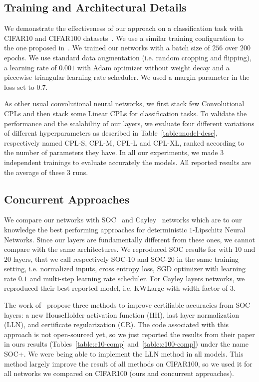 \subsection{Training and Architectural Details}
\label{sec:setting-xp}

We demonstrate the effectiveness of our approach on a classification task with CIFAR10 and CIFAR100 datasets~\citep{krizhevsky2009learning}. We use a similar training configuration to the one proposed in~\citep{trockman2021orthogonalizing}.
We trained our networks with a batch size of $256$ over $200$ epochs.
We use standard data augmentation (i.e. random cropping and flipping), a learning rate of $0.001$ with Adam optimizer \citep{diederik2014adam} without weight decay and a piecewise triangular learning rate scheduler. We used a margin parameter in the loss set to $0.7$.

As other usual convolutional neural networks, we first stack few Convolutional CPLs and then stack some Linear CPLs for classification tasks. To validate the performance  and the scalability of our layers,  we  evaluate four different variations of different hyperparameters as described in Table~\ref{table:model-desc}, respectively named CPL-S, CPL-M, CPL-L and CPL-XL, ranked according to the number of parameters they have. In all our experiments, we made $3$ independent trainings to evaluate accurately the models. All reported results are the average of these $3$ runs.

\subsection{Concurrent Approaches} We compare our networks with SOC~\citep{skew2021sahil} and Cayley~\cite{trockman2021orthogonalizing} networks which are to our knowledge the best performing approaches for deterministic $1$-Lipschitz Neural Networks. Since our layers are fundamentally different from these ones, we cannot compare with the same architectures. We reproduced SOC results for with $10$ and $20$ layers, that we call respectively SOC-$10$ and SOC-$20$ in the same training setting, {i.e.} normalized inputs, cross entropy loss, SGD optimizer with learning rate $0.1$ and multi-step learning rate scheduler. For Cayley layers networks, we reproduced their best reported model, {i.e.} KWLarge with width factor of $3$. 

The work of~\citet{singla2021householder} propose three methods to improve certifiable accuracies from SOC layers: a new HouseHolder activation function (HH),  last layer normalization (LLN), and certificate regularization (CR). The code associated with this approach is not open-sourced yet, so we just reported the results from their paper in ours results (Tables~\ref{table:c10-comp} and~\ref{table:c100-comp}) under the name SOC+. We were being able to implement the LLN method in all models. This method largely improve the result of all methods on CIFAR100, so we used it for all networks we compared on CIFAR100 (ours and concurrent approaches).


